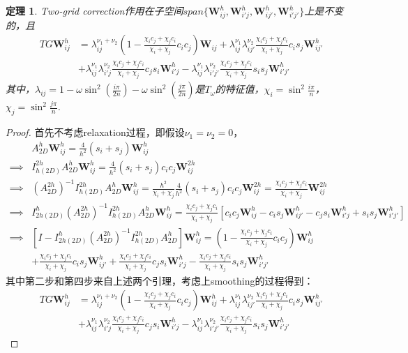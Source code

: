 \documentclass[a4paper,11.5pt,UTF8]{ctexart}
\newtheorem{thm}{定理}[section]
\begin{document}
\begin{large}
\begin{thm}
	Two-grid correction作用在子空间$span\{\mathbf{W}_{ij}^{h},\mathbf{W}_{i'j}^{h},\mathbf{W}_{ij'}^{h},\mathbf{W}_{i'j'}^{h}\}$上是不变的，且
	\begin{align*}
		TG\mathbf{W}_{ij}^{h} &= \lambda_{ij}^{\nu_1+\nu_2}\left(1-\frac{\chi_ic_j+\chi_jc_i}{\chi_i+\chi_j}c_ic_j\right)\mathbf{W}_{ij} + \lambda_{ij}^{\nu_1}\lambda_{ij'}^{\nu_2}\frac{\chi_ic_j+\chi_jc_i}{\chi_i+\chi_j}c_is_j\mathbf{W}_{ij'}^{h} \\ &+ \lambda_{ij}^{\nu_1}\lambda_{i'j}^{\nu_2}\frac{\chi_ic_j+\chi_jc_i}{\chi_i+\chi_j}c_js_i\mathbf{W}_{i'j}^{h} - \lambda_{ij}^{\nu_1}\lambda_{i'j'}^{\nu_2}\frac{\chi_ic_j+\chi_jc_i}{\chi_i+\chi_j}s_is_j\mathbf{W}_{i'j'}^{h}
	\end{align*}
	其中，$\lambda_{ij}=1-\omega\sin^2(\frac{i\pi}{2n})-\omega\sin^2(\frac{j\pi}{2n})$是$T_{\omega}$的特征值，$\chi_i=\sin^2\frac{i\pi}{n}$，$\chi_j=\sin^2\frac{j\pi}{n}$.
\end{thm}
\begin{proof}
	首先不考虑relaxation过程，即假设$\nu_1=\nu_2=0$，
	\begin{align*}
		&A^h_{2D}\mathbf{W}_{ij}^h=\frac{4}{h^2}(s_i+s_j)\mathbf{W}_{ij}^h \\
		\implies& I^{2h}_{h(2D)}A^h_{2D}\mathbf{W}_{ij}^h=\frac{4}{h^2}(s_i+s_j)c_ic_j\mathbf{W}_{ij}^{2h} \\
		\implies& (A^{2h}_{2D})^{-1}I^{2h}_{h(2D)}A^h_{2D}\mathbf{W}_{ij}^h=\frac{h^2}{\chi_i+\chi_j}\frac{4}{h^2}(s_i+s_j)c_ic_j\mathbf{W}_{ij}^{2h}=\frac{\chi_ic_j+\chi_jc_i}{\chi_i+\chi_j}\mathbf{W}_{ij}^{2h} \\
		\implies& I_{2h(2D)}^{h}(A^{2h}_{2D})^{-1}I^{2h}_{h(2D)}A^h_{2D}\mathbf{W}_{ij}^h=\frac{\chi_ic_j+\chi_jc_i}{\chi_i+\chi_j}[c_ic_j\mathbf{W}_{ij}^h-c_is_j\mathbf{W}_{ij'}^h-c_js_i\mathbf{W}_{i'j}^h+s_is_j\mathbf{W}_{i'j'}^h] \\
		\implies& [I-I_{2h(2D)}^{h}(A^{2h}_{2D})^{-1}I^{2h}_{h(2D)}A^h_{2D}]\mathbf{W}_{ij}^h=\left(1-\frac{\chi_ic_j+\chi_jc_i}{\chi_i+\chi_j}c_ic_j\right)\mathbf{W}_{ij}^h \\
		&+ \frac{\chi_ic_j+\chi_jc_i}{\chi_i+\chi_j}c_is_j\mathbf{W}_{ij'}^{h} + \frac{\chi_ic_j+\chi_jc_i}{\chi_i+\chi_j}c_js_i\mathbf{W}_{i'j}^{h} - \frac{\chi_ic_j+\chi_jc_i}{\chi_i+\chi_j}s_is_j\mathbf{W}_{i'j'}^{h}
	\end{align*}
	其中第二步和第四步来自上述两个引理，考虑上smoothing的过程得到：
	\begin{align*}
	TG\mathbf{W}_{ij}^{h} &= \lambda_{ij}^{\nu_1+\nu_2}\left(1-\frac{\chi_ic_j+\chi_jc_i}{\chi_i+\chi_j}c_ic_j\right)\mathbf{W}_{ij}^h + \lambda_{ij}^{\nu_1}\lambda_{ij'}^{\nu_2}\frac{\chi_ic_j+\chi_jc_i}{\chi_i+\chi_j}c_is_j\mathbf{W}_{ij'}^{h} \\ &+ \lambda_{ij}^{\nu_1}\lambda_{i'j}^{\nu_2}\frac{\chi_ic_j+\chi_jc_i}{\chi_i+\chi_j}c_js_i\mathbf{W}_{i'j}^{h} - \lambda_{ij}^{\nu_1}\lambda_{i'j'}^{\nu_2}\frac{\chi_ic_j+\chi_jc_i}{\chi_i+\chi_j}s_is_j\mathbf{W}_{i'j'}^{h}

\end{align*}
\end{proof}
\end{large}
\end{document}
